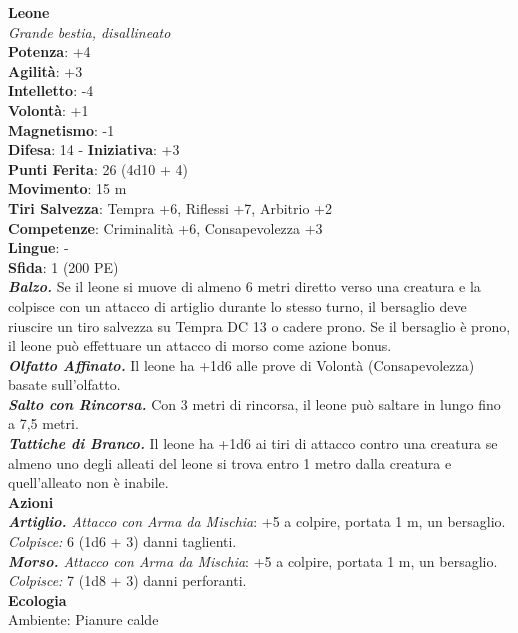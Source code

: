 \begin{multicols}{2}
\medskip\textbf{Leone}\\
\emph{Grande bestia, disallineato}\\
\textbf{Potenza}: +4\\
\textbf{Agilità}: +3\\
\textbf{Intelletto}: -4\\
\textbf{Volontà}: +1\\
\textbf{Magnetismo}: -1\\
\textbf{Difesa}: 14 - \textbf{Iniziativa}: +3\\
\textbf{Punti Ferita}: 26 (4d10 + 4)\\
\textbf{Movimento}: 15 m\\
\textbf{Tiri Salvezza}: Tempra +6, Riflessi +7, Arbitrio +2 \\
\textbf{Competenze}: Criminalità +6, Consapevolezza +3\\
\textbf{Lingue}: -\\
\textbf{Sfida}: 1 (200 PE)\smallskip\\
\emph{\textbf{Balzo.}} Se il leone si muove di almeno 6 metri diretto verso una creatura e la colpisce con un attacco di artiglio durante lo stesso turno, il bersaglio deve riuscire un tiro salvezza su Tempra DC 13 o cadere prono. Se il bersaglio è prono, il leone può effettuare un attacco di morso come azione bonus.\\
\emph{\textbf{Olfatto Affinato.}} Il leone ha +1d6 alle prove di Volontà (Consapevolezza) basate sull'olfatto.\\
\emph{\textbf{Salto con Rincorsa.}} Con 3 metri di rincorsa, il leone può saltare in lungo fino a 7,5 metri.\\
\emph{\textbf{Tattiche di Branco.}} Il leone ha +1d6 ai tiri di attacco contro una creatura se almeno uno degli alleati del leone si trova entro 1 metro dalla creatura e quell'alleato non è inabile.\\
\smallskip\textbf{Azioni}\\
\emph{\textbf{Artiglio.} Attacco con Arma da Mischia}: +5 a colpire, portata 1 m, un bersaglio.\\
\emph{Colpisce:} 6 (1d6 + 3) danni taglienti.\\
\emph{\textbf{Morso.} Attacco con Arma da Mischia}: +5 a colpire, portata 1 m, un bersaglio.\\
\emph{Colpisce:} 7 (1d8 + 3) danni perforanti.\\
\textbf{Ecologia}\\
Ambiente: Pianure calde\\

\end{multicols}
